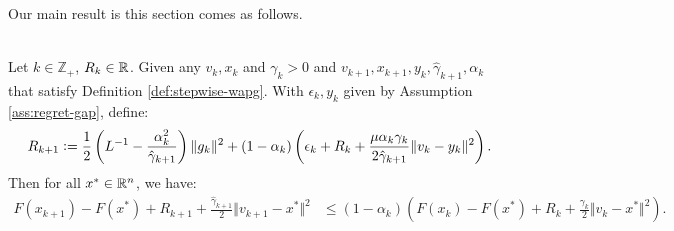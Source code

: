 \documentclass[12pt]{article}
\begin{document}
    Our main result is this section comes as follows.
    \begin{proposition}\label{prop:stepwise-lyapunov}\;\\
        Let $k \in \mathbb Z_+$, $R_k \in \mathbb R$.
        Given any $v_k, x_k$ and $\gamma_k > 0$ and $v_{k + 1}, x_{k + 1}, y_k, \hat \gamma_{k + 1}, \alpha_k$ that satisfy Definition \ref{def:stepwise-wapg}.
        With $\epsilon_k, y_k$ given by Assumption \ref{ass:regret-gap}, define:
        \begin{align}\label{eqn:stepwise-lya-1}
            R_{k + 1}
            \vcentcolon=
            \frac{1}{2}\left(
                L^{-1} - \frac{\alpha_k^2}{\hat \gamma_{k + 1}}
            \right)\Vert g_k\Vert^2
            +
            (1 - \alpha_k)
            \left(
                \epsilon_k + R_k +
                \frac{\mu\alpha_k\gamma_k}{2\hat \gamma_{k + 1}}
                \Vert v_k - y_k\Vert^2
            \right).
        \end{align}
        Then for all $x^* \in \mathbb R^n$, we have:
        {\small
        \begin{align}\label{ineq:stepwise-lya-2}
            F(x_{k + 1}) - F(x^*) + R_{k + 1} + \frac{\hat \gamma_{k + 1}}{2}\Vert v_{k + 1} - x^*\Vert^2
            &\le
            (1 - \alpha_k)
            \left(
                F(x_k) - F(x^*) + R_k + \frac{\gamma_{k}}{2}\Vert v_k - x^*\Vert^2
            \right).
        \end{align}
        }
    \end{proposition}
\end{document}
